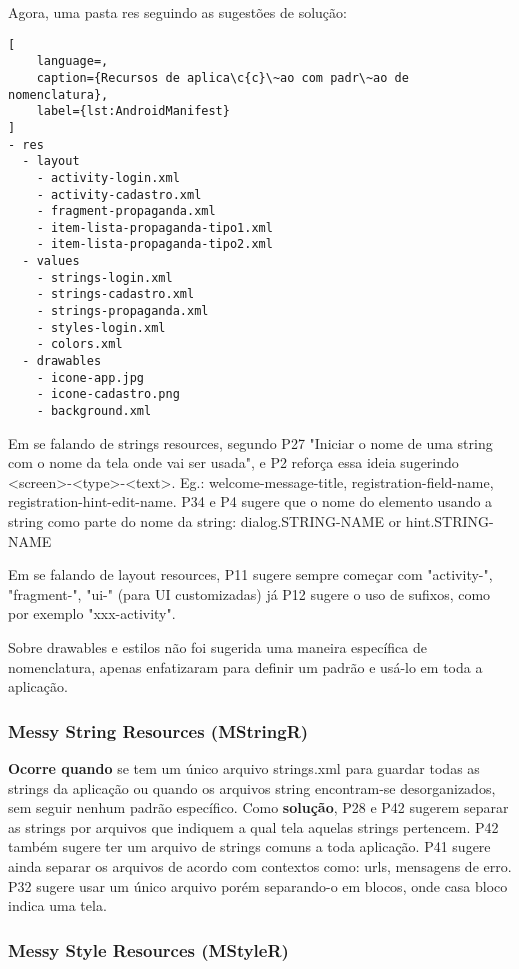 Agora, uma pasta res seguindo as sugest\~oes de solu\c{c}\~ao:

\begin{lstlisting}[
	language=, 
	caption={Recursos de aplica\c{c}\~ao com padr\~ao de nomenclatura}, 
	label={lst:AndroidManifest}
]
- res 
  - layout 
    - activity-login.xml 
    - activity-cadastro.xml 
    - fragment-propaganda.xml 
    - item-lista-propaganda-tipo1.xml 
    - item-lista-propaganda-tipo2.xml 
  - values 
    - strings-login.xml  
    - strings-cadastro.xml  
    - strings-propaganda.xml  
    - styles-login.xml 
    - colors.xml 
  - drawables 
    - icone-app.jpg 
    - icone-cadastro.png 
    - background.xml 
\end{lstlisting}

Em se falando de strings resources, segundo P27 "Iniciar o nome de uma string com o nome da tela onde vai ser usada", e P2 refor\c{c}a essa ideia sugerindo <screen>-<type>-<text>. Eg.: welcome-message-title, registration-field-name, registration-hint-edit-name. P34 e P4 sugere que o nome do elemento usando a string como parte do nome da string: dialog.STRING-NAME or hint.STRING-NAME

Em se falando de layout resources, P11 sugere sempre come\c{c}ar com "activity-", "fragment-", "ui-" (para UI customizadas) j\'a P12 sugere o uso de sufixos, como por exemplo "xxx-activity".

Sobre drawables e estilos n\~ao foi sugerida uma maneira espec\'ifica de nomenclatura, apenas enfatizaram para definir um padr\~ao e us\'a-lo em toda a aplica\c{c}\~ao.


\subsubsection{Messy String Resources (MStringR)} 

\textbf{Ocorre quando} se tem um \'unico arquivo strings.xml para guardar todas as strings da aplica\c{c}\~ao ou quando os arquivos string encontram-se desorganizados, sem seguir nenhum padr\~ao espec\'ifico. Como \textbf{solu\c{c}\~ao}, P28 e P42 sugerem separar as strings por arquivos que indiquem a qual tela aquelas strings pertencem. P42 tamb\'em sugere ter um arquivo de strings comuns a toda aplica\c{c}\~ao. P41 sugere ainda separar os arquivos de acordo com contextos como: urls, mensagens de erro. P32 sugere usar um \'unico arquivo por\'em separando-o em blocos, onde casa bloco indica uma tela.



\subsubsection{Messy Style Resources (MStyleR)} 

